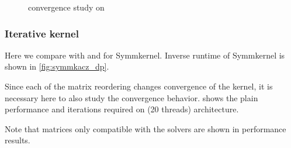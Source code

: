 \begin{figure}[thbp]
	\centering
	\hspace{1em}
	\caption{\SYMMKACZ convergence study on \SKX}
	\label{fig:symmkacz_convergence}
\end{figure}
\subsubsection{Iterative kernel}
Here we compare  \RACE with \ABMC and \MC for Symm\KACZ kernel. Inverse runtime of Symm\KACZ kernel is shown in \cref{fig:symmkacz_dp}.

 Since each of the matrix reordering changes convergence of the kernel, it is necessary here to also study the convergence behavior.  shows the plain performance and iterations required on \SKX (20 threads) architecture.

Note that matrices only compatible with the \KACZ solvers are shown in performance results.

